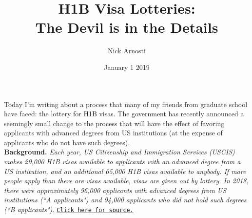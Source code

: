\documentclass[11pt, oneside]{article}   	%
\title{\vspace{-.5 in} H1B Visa Lotteries: \\The Devil is in the Details}
\author{Nick Arnosti}
\date{January 1 2019}							%
\newcommand{\link}[2]{{\color{blue}\tt{\href{#1}{#2}}}}
\begin{document}
\maketitle

Today I'm writing about a process that many of my friends from graduate school have faced: the lottery for H1B visas. The government has recently announced a seemingly small change to the process that will have the effect of favoring applicants with advanced degrees from US institutions (at the expense of applicants who do not have such degrees). \\


{\bf Background.}
{\it Each year, US Citizenship and Immigration Services (USCIS) makes 20,000 H1B visas available to applicants with an advanced degree from a US institution, and an additional 65,000 H1B visas available to anybody. If more people apply than there are visas available, visas are given out by lottery. In 2018, there were approximately 96,000 applicants with advanced degrees from US institutions (``A applicants") and 94,000 applicants who did not hold such degrees (``B applicants").} \link{https://www.uscis.gov/working-united-states/temporary-workers/h-1b-specialty-occupations-and-fashion-models/h-1b-fiscal-year-fy-2019-cap-season}{Click here for source.} \\
\end{document}
